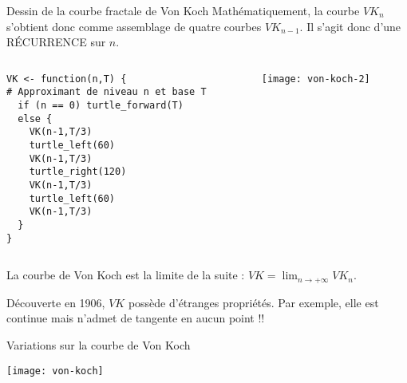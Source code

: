 \documentclass[10pt]{beamer}
\begin{document}
\begin{frame}[fragile]{Dessin de la courbe fractale de Von Koch}
  Mathématiquement, la courbe $VK_n$ s'obtient donc comme assemblage de quatre courbes $VK_{n-1}$.
  Il s'agit donc d'une RÉCURRENCE sur $n$.

\begin{columns}[c]
\begin{column}{0.6\textwidth}
  \begin{lstlisting}[style=editor]
VK <- function(n,T) {
# Approximant de niveau n et base T
  if (n == 0) turtle_forward(T)
  else {
    VK(n-1,T/3)
    turtle_left(60)
    VK(n-1,T/3)
    turtle_right(120)
    VK(n-1,T/3)
    turtle_left(60)
    VK(n-1,T/3)
  }
}
  \end{lstlisting}
\end{column}
\begin{column}{0.38\textwidth}
  \texttt{[image: von-koch-2]}
\end{column}
\end{columns}
La courbe de Von Koch est la limite de la suite : $VK = \lim_{n \rightarrow + \infty} VK_n$.

Découverte en 1906, $VK$ possède d'étranges propriétés. Par exemple, elle est continue mais n'admet de tangente en aucun point !!
\end{frame}


\begin{frame}{Variations sur la courbe de Von Koch}
  \begin{center}
    \texttt{[image: von-koch]}
  \end{center}
\end{frame}



\questionSlide

 \appendix
 \backupSlides







\end{document}
